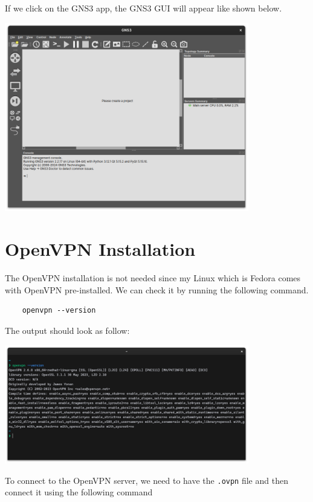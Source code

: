 \documentclass[12pt,titlepage]{article}
\begin{document}
If we click on the GNS3 app, the GNS3 GUI will appear like shown below.

\begin{center}
    \includegraphics[width=0.8\textwidth]{./images/gns3-gui.png}
\end{center}

\section{OpenVPN Installation}

The OpenVPN installation is not needed since my Linux which is Fedora comes with
OpenVPN pre-installed. We can check it by running the following command.

\begin{verbatim}
    openvpn --version
\end{verbatim}

The output should look as follow:

\begin{center}
    \includegraphics[width=0.8\textwidth]{./images/openvpn-version.png}
\end{center}

To connect to the OpenVPN server, we need to have the \texttt{.ovpn} file
and then connect it using the following command
\end{document}
